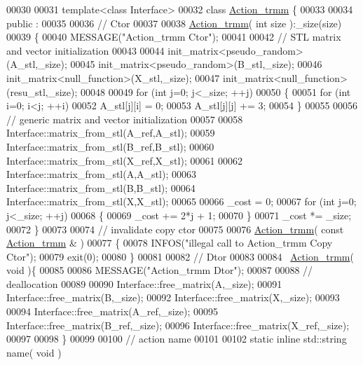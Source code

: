 \begin{DoxyCode}
00030 
00031 \textcolor{keyword}{template}<\textcolor{keyword}{class} Interface>
00032 \textcolor{keyword}{class }\hyperlink{class_action__trmm}{Action\_trmm} \{
00033 
00034 public :
00035 
00036   \textcolor{comment}{// Ctor}
00037 
00038   \hyperlink{class_action__trmm}{Action\_trmm}( \textcolor{keywordtype}{int} size ):\_size(size)
00039   \{
00040     MESSAGE(\textcolor{stringliteral}{"Action\_trmm Ctor"});
00041 
00042     \textcolor{comment}{// STL matrix and vector initialization}
00043 
00044     init\_matrix<pseudo\_random>(A\_stl,\_size);
00045     init\_matrix<pseudo\_random>(B\_stl,\_size);
00046     init\_matrix<null\_function>(X\_stl,\_size);
00047     init\_matrix<null\_function>(resu\_stl,\_size);
00048 
00049     \textcolor{keywordflow}{for} (\textcolor{keywordtype}{int} j=0; j<\_size; ++j)
00050     \{
00051       \textcolor{keywordflow}{for} (\textcolor{keywordtype}{int} i=0; i<j; ++i)
00052         A\_stl[j][i] = 0;
00053       A\_stl[j][j] += 3;
00054     \}
00055 
00056     \textcolor{comment}{// generic matrix and vector initialization}
00057 
00058     Interface::matrix\_from\_stl(A\_ref,A\_stl);
00059     Interface::matrix\_from\_stl(B\_ref,B\_stl);
00060     Interface::matrix\_from\_stl(X\_ref,X\_stl);
00061 
00062     Interface::matrix\_from\_stl(A,A\_stl);
00063     Interface::matrix\_from\_stl(B,B\_stl);
00064     Interface::matrix\_from\_stl(X,X\_stl);
00065 
00066     \_cost = 0;
00067     \textcolor{keywordflow}{for} (\textcolor{keywordtype}{int} j=0; j<\_size; ++j)
00068     \{
00069       \_cost += 2*j + 1;
00070     \}
00071     \_cost *= \_size;
00072   \}
00073 
00074   \textcolor{comment}{// invalidate copy ctor}
00075 
00076   \hyperlink{class_action__trmm}{Action\_trmm}( \textcolor{keyword}{const}  \hyperlink{class_action__trmm}{Action\_trmm} & )
00077   \{
00078     INFOS(\textcolor{stringliteral}{"illegal call to Action\_trmm Copy Ctor"});
00079     exit(0);
00080   \}
00081 
00082   \textcolor{comment}{// Dtor}
00083 
00084   ~\hyperlink{class_action__trmm}{Action\_trmm}( \textcolor{keywordtype}{void} )\{
00085 
00086     MESSAGE(\textcolor{stringliteral}{"Action\_trmm Dtor"});
00087 
00088     \textcolor{comment}{// deallocation}
00089 
00090     Interface::free\_matrix(A,\_size);
00091     Interface::free\_matrix(B,\_size);
00092     Interface::free\_matrix(X,\_size);
00093 
00094     Interface::free\_matrix(A\_ref,\_size);
00095     Interface::free\_matrix(B\_ref,\_size);
00096     Interface::free\_matrix(X\_ref,\_size);
00097 
00098   \}
00099 
00100   \textcolor{comment}{// action name}
00101 
00102   \textcolor{keyword}{static} \textcolor{keyword}{inline} std::string name( \textcolor{keywordtype}{void} )

\end{DoxyCode}
